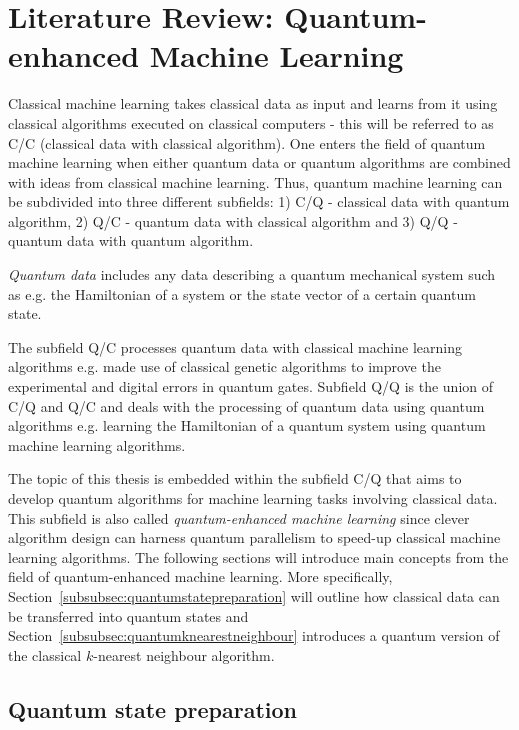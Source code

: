 \chapter{Literature Review: Quantum-enhanced Machine Learning}\label{sec:qml}

Classical machine learning takes classical data as input and learns from it using classical algorithms executed on classical computers - this will be referred to as C/C (classical data with classical algorithm). One enters the field of quantum machine learning when either quantum data or quantum algorithms are combined with ideas from classical machine learning. Thus, quantum machine learning can be subdivided into three different subfields: 1) C/Q - classical data with quantum algorithm, 2) Q/C - quantum data with classical algorithm and 3) Q/Q - quantum data with quantum algorithm.

\emph{Quantum data} includes any data describing a quantum mechanical system such as e.g. the Hamiltonian of a system or the state vector of a certain quantum state. 

The subfield Q/C processes quantum data with classical machine learning algorithms e.g.  made use of classical genetic algorithms to improve the experimental and digital errors in quantum gates. Subfield Q/Q  is the union of C/Q and Q/C and deals with the processing of quantum data using quantum algorithms e.g. learning the Hamiltonian of a quantum system using quantum machine learning algorithms.

The topic of this thesis is embedded within the subfield C/Q that aims to develop quantum algorithms for machine learning tasks involving classical data. This subfield is also called \emph{quantum-enhanced machine learning} since clever algorithm design can harness quantum parallelism to speed-up classical machine learning algorithms. The following sections will introduce main concepts from the field of quantum-enhanced machine learning. More specifically, Section~\ref{subsubsec:quantumstatepreparation} will outline how classical data can be transferred into quantum states and Section~\ref{subsubsec:quantumknearestneighbour} introduces a quantum version of the classical $k$-nearest neighbour algorithm.

\newpage
\section{Quantum state preparation}
\label{subsec:quantumstatepreparation}

